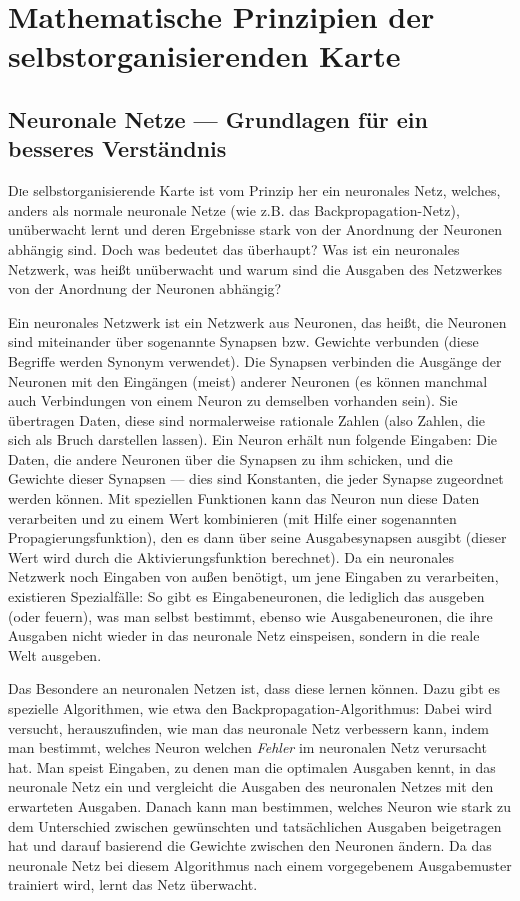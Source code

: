 \documentclass[twoside,a4paper,draft]{article}
\newcommand{\commonlettrine}[1]{\lettrine[nindent=0em,lines=2]{#1}}
\begin{document}
\section{Mathematische Prinzipien der selbstorganisierenden Karte}
\subsection{Neuronale Netze --- Grundlagen für ein besseres Verständnis}

\commonlettrine{D}ie selbstorganisierende Karte ist vom Prinzip her ein neuronales Netz, welches, anders als \glqq{}normale\grqq{} neuronale Netze (wie z.B. das Backpropagation-Netz), unüberwacht lernt und deren Ergebnisse stark von der Anordnung der Neuronen abhängig sind. Doch was bedeutet das überhaupt? Was ist ein neuronales Netzwerk, was heißt \glqq{}unüberwacht\grqq{} und warum sind die Ausgaben des Netzwerkes von der Anordnung der Neuronen abhängig?

Ein neuronales Netzwerk ist ein Netzwerk aus Neuronen, das heißt, die Neuronen sind miteinander über sogenannte Synapsen bzw. Gewichte verbunden (diese Begriffe werden Synonym verwendet). Die Synapsen verbinden die Ausgänge der Neuronen mit den Eingängen (meist) anderer Neuronen (es können manchmal auch Verbindungen von einem Neuron zu demselben vorhanden sein). Sie übertragen Daten, diese sind normalerweise rationale Zahlen (also Zahlen, die sich als Bruch darstellen lassen). Ein Neuron erhält nun folgende Eingaben: Die Daten, die andere Neuronen über die Synapsen zu ihm schicken, und die \glqq{}Gewichte\grqq{} dieser Synapsen --- dies sind Konstanten, die jeder Synapse zugeordnet werden können. Mit speziellen Funktionen kann das Neuron nun diese Daten verarbeiten und zu einem Wert kombinieren (mit Hilfe einer sogenannten Propagierungsfunktion), den es dann über seine Ausgabesynapsen ausgibt (dieser Wert wird durch die Aktivierungsfunktion berechnet). Da ein neuronales Netzwerk noch Eingaben von außen benötigt, um jene Eingaben zu verarbeiten, existieren Spezialfälle: So gibt es Eingabeneuronen, die lediglich das ausgeben (oder \glqq{}feuern\grqq{}), was man selbst bestimmt, ebenso wie Ausgabeneuronen, die ihre Ausgaben nicht wieder in das neuronale Netz einspeisen, sondern in die reale Welt ausgeben.

Das Besondere an neuronalen Netzen ist, dass diese lernen können. Dazu gibt es spezielle Algorithmen, wie etwa den Backpropagation-Algorithmus: Dabei wird versucht, herauszufinden, wie man das neuronale Netz verbessern kann, indem man bestimmt, welches Neuron welchen \emph{Fehler} im neuronalen Netz verursacht hat. Man speist Eingaben, zu denen man die optimalen Ausgaben kennt, in das neuronale Netz ein und vergleicht die Ausgaben des neuronalen Netzes mit den erwarteten Ausgaben. Danach kann man bestimmen, welches Neuron wie stark zu dem Unterschied zwischen gewünschten und tatsächlichen Ausgaben beigetragen hat und darauf basierend die Gewichte zwischen den Neuronen ändern. Da das neuronale Netz bei diesem Algorithmus nach einem vorgegebenem Ausgabemuster trainiert wird, lernt das Netz \glqq{}überwacht\grqq{}.
\end{document}
